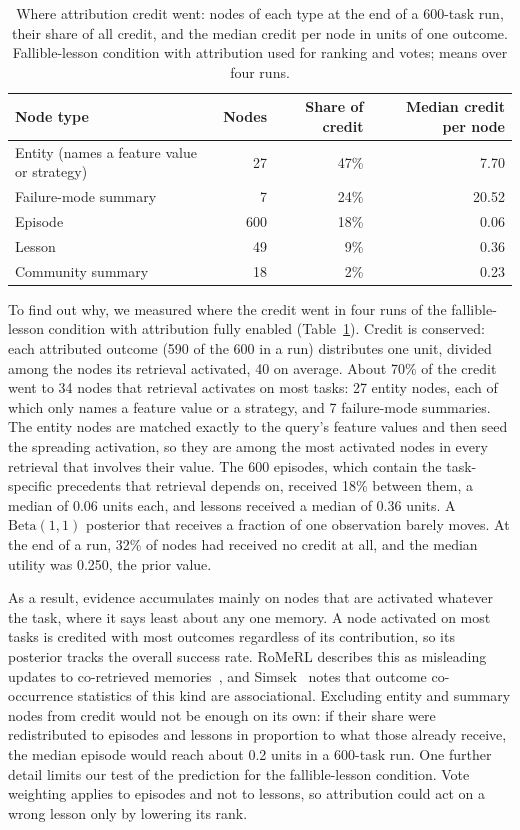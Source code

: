 \documentclass{article}
\begin{document}
\begin{table}[t]
\centering
\caption{Where attribution credit went: nodes of each type at the end of a 600-task
run, their share of all credit, and the median credit per node in units of one outcome.
Fallible-lesson condition with attribution used for ranking and votes; means over four
runs.}
\label{tab:credit}
\small
\begin{tabular}{lrrr}
\toprule
Node type & Nodes & Share of credit & Median credit per node \\
\midrule
Entity (names a feature value or strategy) & 27 & 47\% & 7.70 \\
Failure-mode summary & 7 & 24\% & 20.52 \\
Episode & 600 & 18\% & 0.06 \\
Lesson & 49 & 9\% & 0.36 \\
Community summary & 18 & 2\% & 0.23 \\
\bottomrule
\end{tabular}
\end{table}

To find out why, we measured where the credit went in four runs of the fallible-lesson
condition with attribution fully enabled (Table~\ref{tab:credit}). Credit is conserved:
each attributed outcome (590 of the 600 in a run) distributes one unit, divided among
the nodes its retrieval activated, 40 on average. About 70\% of the credit went to 34
nodes that retrieval activates on most tasks: 27 entity nodes, each of which only names a
feature value or a strategy, and 7 failure-mode summaries. The entity nodes are matched
exactly to the query's feature values and then seed the spreading activation, so they
are among the most activated nodes in every retrieval that involves their value. The
600 episodes, which
contain the task-specific precedents that retrieval depends on, received 18\% between
them, a median of 0.06 units each, and lessons received a median of 0.36 units. A
$\mathrm{Beta}(1,1)$ posterior that receives a fraction of one observation barely moves.
At the end of a run, 32\% of nodes had received no credit at all, and the median utility
was 0.250, the prior value.

As a result, evidence accumulates mainly on nodes that are activated whatever the task,
where it says least about any one memory. A node activated on most tasks is credited with
most outcomes regardless of its contribution, so its posterior tracks the overall success
rate. RoMeRL describes this as misleading updates to co-retrieved
memories~\cite{romerl}, and Simsek~\cite{whentoforget} notes that outcome co-occurrence
statistics of this kind are associational. Excluding entity and summary
nodes from credit would not be enough on its own: if their share were redistributed to
episodes and lessons in proportion to what those already receive, the median episode
would reach about 0.2 units in a 600-task run. One further detail limits our test of the
prediction for the fallible-lesson condition. Vote weighting applies to episodes and not
to lessons, so attribution could act on a wrong lesson only by lowering its rank.
\end{document}
